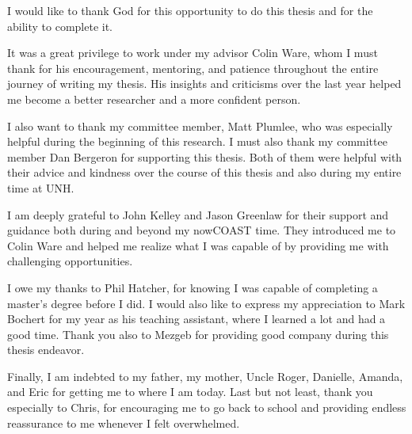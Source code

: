 \documentclass[11pt]{report}
\begin{document}
\begin{acknowledgments}
I would like to thank God for this opportunity to do this thesis and for the ability to complete it.

It was a great privilege to work under my advisor Colin Ware, whom I must thank for his encouragement, mentoring, and patience throughout the entire journey of writing my thesis.  His insights and criticisms over the last year helped me become a better researcher and a more confident person.

I also want to thank my committee member, Matt Plumlee, who was especially helpful during the beginning of this research.  I must also thank my committee member Dan Bergeron for supporting this thesis.  Both of them were helpful with their advice and kindness over the course of this thesis and also during my entire time at UNH.

I am deeply grateful to John Kelley and Jason Greenlaw for their support and guidance both during and beyond my nowCOAST time.  They introduced me to Colin Ware and helped me realize what I was capable of by providing me with challenging opportunities.

I owe my thanks to Phil Hatcher, for knowing I was capable of completing a master's degree before I did.  I would also like to express my appreciation to Mark Bochert for my year as his teaching assistant, where I learned a lot and had a good time.  Thank you also to Mezgeb for providing good company during this thesis endeavor.

Finally, I am indebted to my father, my mother, Uncle Roger, Danielle, Amanda, and Eric for getting me to where I am today.  Last but not least, thank you especially to Chris, for encouraging me to go back to school and providing endless reassurance to me whenever I felt overwhelmed.  

\end{acknowledgments}                                   %


\tableofcontents					%
\listoffigures						%













\begin{appendices}







\end{appendices}
\end{document}
